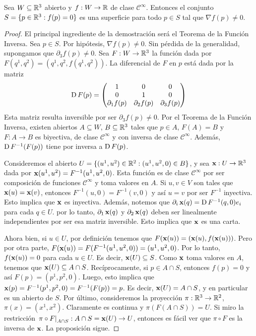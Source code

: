 \begin{prop}\label{prop::valoresregulares}
Sea $W\subseteq\mathbb{R}^3$ abierto y $f:W\to\mathbb{R}$ de clase $\mathscr{C}^\infty$. Entonces el conjunto $S=\{p\in\mathbb{R}^3 : f(p)=0\}$ es una superficie para todo $p\in S$ tal que $\nabla f(p)\neq 0$.
\begin{proof}
El principal ingrediente de la demostración será el Teorema de la Función Inversa. Sea $p\in S$. Por hipótesis, $\nabla f(p)\neq 0$. Sin pérdida de la generalidad, supongamos que $\partial_3 f(p)\neq 0$. Sea $F:W\to\mathbb{R}^3$ la función dada por $F(q^1,q^2) = (q^1,q^2,f(q^1,q^2))$. La diferencial de $F$ en $p$ está dada por la matriz $$\operatorname{\mathrm{D}} F(p)=\begin{pmatrix}1&0&0\\0&1&0\\ \partial_1f(p)&\partial_2f(p)&\partial_3f(p)\end{pmatrix}$$ Esta matriz resulta inversible por ser $\partial_3f(p)\neq 0$. Por el Teorema de la Función Inversa, existen abiertos $A\subseteq W$, $B\subseteq\mathbb{R}^3$ tales que $p\in A$, $F(A)=B$ y $F:A\to B$ es biyectiva, de clase $\mathscr{C}^\infty$ y con inversa de clase $\mathscr{C}^\infty$. Además, $\operatorname{\mathrm{D}} F^{-1}(F(p))$ tiene por inversa a $\operatorname{\mathrm{D}} F(p)$.

Consideremos el abierto $U=\{(u^1,u^2)\in\mathbb{R}^2 : (u^1,u^2,0)\in B\}$, y sea $\operatorname{\mathbf{x}}:U\to\mathbb{R}^3$ dada por $\operatorname{\mathbf{x}}(u^1,u^2)=F^{-1}(u^1,u^2,0)$. Esta función es de clase $\mathscr{C}^\infty$ por ser composición de funciones $\mathscr{C}^\infty$ y toma valores en $A$. Si $u,v\in V$ son tales que $\operatorname{\mathbf{x}}(u)=\operatorname{\mathbf{x}}(v)$, entonces $F^{-1}(u,0)=F^{-1}(v,0)$ y así $u=v$ por ser $F^{-1}$ inyectiva. Esto implica que $\operatorname{\mathbf{x}}$ es inyectiva. Además, notemos que $\partial_i\operatorname{\mathbf{x}}(q) = \operatorname{\mathrm{D}} F^{-1}(q,0)e_i$ para cada $q\in U$. por lo tanto, $\partial_1\operatorname{\mathbf{x}}(q)$ y $\partial_2\operatorname{\mathbf{x}}(q)$ deben ser linealmente independientes por ser esa matriz inversible. Esto implica que $\operatorname{\mathbf{x}}$ es una carta.

Ahora bien, si $u\in U$, por definición tenemos que $F(\operatorname{\mathbf{x}}(u)) = (\operatorname{\mathbf{x}}(u),f(\operatorname{\mathbf{x}}(u)))$. Pero por otra parte, $F(\operatorname{\mathbf{x}}(u)) = F(F^{-1}(u^1,u^2,0)) = (u^1,u^2,0)$. Por lo tanto, $f(\operatorname{\mathbf{x}}(u))=0$ para cada $u\in U$. Es decir, $\operatorname{\mathbf{x}}(U)\subseteq S$. Como $\operatorname{\mathbf{x}}$ toma valores en $A$, tenemos que $\operatorname{\mathbf{x}}(U)\subseteq A\cap S$. Recíprocamente, si $p\in A\cap S$, entonces $f(p)=0$ y así $F(p)=(p^1,p^2,0)$. Luego, esto implica que $\operatorname{\mathbf{x}}(p)=F^{-1}(p^1,p^2,0)=F^{-1}(F(p))=p$. Es decir, $\operatorname{\mathbf{x}}(U)=A\cap S$, y en particular es un abierto de $S$. Por último, consideremos la proyección $\pi:\mathbb{R}^3\to\mathbb{R}^2$, $\pi(x)=(x^1,x^2)$. Claramente es continua y $\pi(F(A\cap S))=U$. Si miro la restricción $\left.\pi\circ F\right|_{A\cap S}:A\cap S = \operatorname{\mathbf{x}}(U)\to U$, entonces es fácil ver que $\pi\circ F$ es la inversa de $\operatorname{\mathbf{x}}$. La proposición sigue.
\end{proof}
\end{prop}

